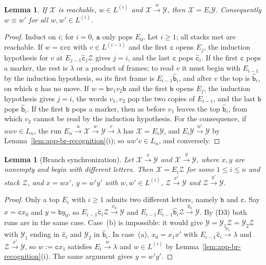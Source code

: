 \documentclass[11pt]{article}
\numberwithin{equation}{section}
\theoremstyle{plain}
\newtheorem{lemma}[theorem]{Lemma}
\theoremstyle{definition}
\theoremstyle{remark}
\theoremstyle{plain}
\newcommand{\eps}{\lambda}
\begin{document}
\begin{lemma}\label{lem:app-br-exchange}
\label{lem:app-tl-exchange}
If $\mathcal X$ is reachable, $w\in L^{(i)}$ and $\mathcal X\xrightarrow{w}\mathcal Y$, then
$\mathcal X=E_i\mathcal Y$.  Consequently $w\equiv w'$ for all $w,w'\in L^{(i)}$.
\end{lemma}

\begin{proof}
Induct on $i$; for $i=0$, $\mathtt a$ only pops $E_0$.  Let $i\ge1$; all stacks met
are reachable.  If $w=\mathtt cv\mathtt c$ with $v\in L^{(i-1)}$ and the first
$\mathtt c$ opens $E_j$, the induction hypothesis for $v$ at
$E_{j-1}\hat{\mathtt c}_j\mathcal Z$ gives $j=i$, and the last $\mathtt c$ pops
$\hat{\mathtt c}_i$.  If the first $\mathtt c$ pops a marker, the rest is $\eps$ or a
product of frames; to read $v$ it must begin with $E_{i-1}$ by the induction
hypothesis, so its first frame is $E_{i-1}\hat{\mathtt b}_i$, and after $v$ the top
is $\hat{\mathtt b}_i$, on which $\mathtt c$ has no move.  If
$w=\mathtt bv_1v_2\mathtt b$ and the first $\mathtt b$ opens $E_j$, the induction
hypothesis gives $j=i$, the words $v_1,v_2$ pop the two copies of $E_{i-1}$, and
the last $\mathtt b$ pops $\hat{\mathtt b}_i$.  If the first $\mathtt b$ pops a marker,
then as before $v_1$ leaves the top $\hat{\mathtt b}_i$, from which $v_2$ cannot be
read by the induction hypothesis.  For the consequence, if $uwv\in L_n$, the run
$E_n\xrightarrow{u}\mathcal X\xrightarrow{w}\mathcal Y\xrightarrow{v}\eps$ has
$\mathcal X=E_i\mathcal Y$, and $E_i\mathcal Y\xrightarrow{w'}\mathcal Y$ by
Lemma~\ref{lem:app-br-recognition}(i); so $uw'v\in L_n$, and conversely.
\end{proof}

\begin{lemma}[Branch synchronization]\label{lem:app-br-branch}
Let $\mathcal X\xrightarrow{x}\mathcal Y$ and $\mathcal X\xrightarrow{y}\mathcal Y$, where $x,y$
are nonempty and begin with different letters.  Then $\mathcal X=E_i\mathcal Z$ for
some $1\le i\le n$ and stack $\mathcal Z$, and $x=wx'$, $y=w'y'$ with
$w,w'\in L^{(i)}$, $\mathcal Z\xrightarrow{x'}\mathcal Y$ and $\mathcal Z\xrightarrow{y'}\mathcal Y$.
\end{lemma}

\begin{proof}
Only a top $E_i$ with $i\ge1$ admits two different letters, namely $\mathtt b$ and
$\mathtt c$.  Say $x=\mathtt cx_0$ and $y=\mathtt by_0$, so
$E_{i-1}\hat{\mathtt c}_i\mathcal Z\xrightarrow{x_0}\mathcal Y$ and
$E_{i-1}E_{i-1}\hat{\mathtt b}_i\mathcal Z\xrightarrow{y_0}\mathcal Y$.  By (D3) both runs
are in the same case.  Case~(b) is impossible: it would give
$\mathcal Y=\mathcal Y_1\mathcal Z=\mathcal Y_2\mathcal Z$ with $\mathcal Y_1$ ending in
$\hat{\mathtt c}_i$ and $\mathcal Y_2$ in $\hat{\mathtt b}_i$.  In case~(a),
$x_0=x_1x'$ with $E_{i-1}\hat{\mathtt c}_i\xrightarrow{x_1}\eps$ and
$\mathcal Z\xrightarrow{x'}\mathcal Y$, so $w:=\mathtt cx_1$ satisfies $E_i\xrightarrow{w}\eps$
and $w\in L^{(i)}$ by Lemma~\ref{lem:app-br-recognition}(i).  The same argument
gives $y=w'y'$.
\end{proof}
\end{document}
